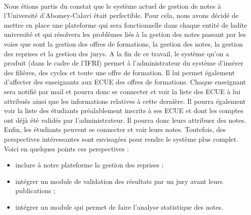 \paragraph{}
Nous étions partis du constat que le système actuel de gestion de notes à l'Université d'Abomey-Calavi était perfectible.
Pour cela, nous avons décidé de mettre en place une plateforme qui sera fonctionnelle dans chaque entité de ladite université et qui résolvera les problèmes
liés à la gestion des notes passant par les voies que sont la gestion des offres de formations, la gestion des notes, la gestion des reprises et la gestion des jurys.
A la fin de ce travail, le système qu'on a produit (dans le cadre de l'IFRI) permet à l'administrateur du système d'insérer des filières, des cycles et toute une offre
de formation. Il lui permet également d'affecter des enseignants aux ECUE des offres de formations. Chaque enseignant sera notifié par mail et pourra donc se connecter
et voir la liste des ECUE à lui attribués ainsi que les informations relatives à cette dernière. Il pourra également voir la liste des étudiants préalablement inscrits
à ses ECUE et dont les comptes ont déjà été validés par l'administrateur. Il pourra donc leurs attribuer des notes. Enfin, les étudiants peuvent se connecter et voir leurs notes.
Toutefois, des perspectives intéressantes sont envisagées pour rendre le système plus complet. Voici en quelques points ces perspectives :
\begin{itemize}
 \item inclure à notre plateforme la gestion des reprises ;
 \item intégrer un module de validation des résultats par un jury avant leurs publications ;
 \item intégrer un module qui permet de faire l'analyse statistique des notes.
\end{itemize}

